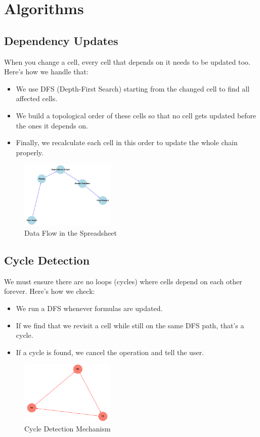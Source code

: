 \documentclass{article}
\begin{document}
\section{Algorithms}

\subsection{Dependency Updates}
When you change a cell, every cell that depends on it needs to be updated too. Here's how we handle that:
\begin{itemize}
    \item We use DFS (Depth-First Search) starting from the changed cell to find all affected cells.
    \item We build a topological order of these cells so that no cell gets updated before the ones it depends on.
    \item Finally, we recalculate each cell in this order to update the whole chain properly.
\end{itemize}
\begin{figure}[h]
    \centering
    \includegraphics[width=0.4\textwidth]{data_flow.png}
    \caption{Data Flow in the Spreadsheet}
\end{figure}

\subsection{Cycle Detection}
We must ensure there are no loops (cycles) where cells depend on each other forever. Here's how we check:
\begin{itemize}
    \item We run a DFS whenever formulas are updated.
    \item If we find that we revisit a cell while still on the same DFS path, that’s a cycle.
    \item If a cycle is found, we cancel the operation and tell the user.
\end{itemize}
\begin{figure}[h]
    \centering
    \includegraphics[width=0.4\textwidth]{cycle_detection.png}
    \caption{Cycle Detection Mechanism}
\end{figure}
\end{document}
